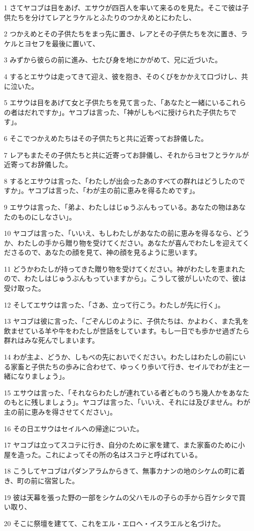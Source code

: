 \par 1 さてヤコブは目をあげ、エサウが四百人を率いて来るのを見た。そこで彼は子供たちを分けてレアとラケルとふたりのつかえめとにわたし、
\par 2 つかえめとその子供たちをまっ先に置き、レアとその子供たちを次に置き、ラケルとヨセフを最後に置いて、
\par 3 みずから彼らの前に進み、七たび身を地にかがめて、兄に近づいた。
\par 4 するとエサウは走ってきて迎え、彼を抱き、そのくびをかかえて口づけし、共に泣いた。
\par 5 エサウは目をあげて女と子供たちを見て言った、「あなたと一緒にいるこれらの者はだれですか」。ヤコブは言った、「神がしもべに授けられた子供たちです」。
\par 6 そこでつかえめたちはその子供たちと共に近寄ってお辞儀した。
\par 7 レアもまたその子供たちと共に近寄ってお辞儀し、それからヨセフとラケルが近寄ってお辞儀した。
\par 8 するとエサウは言った、「わたしが出会ったあのすべての群れはどうしたのですか」。ヤコブは言った、「わが主の前に恵みを得るためです」。
\par 9 エサウは言った、「弟よ、わたしはじゅうぶんもっている。あなたの物はあなたのものにしなさい」。
\par 10 ヤコブは言った、「いいえ、もしわたしがあなたの前に恵みを得るなら、どうか、わたしの手から贈り物を受けてください。あなたが喜んでわたしを迎えてくださるので、あなたの顔を見て、神の顔を見るように思います。
\par 11 どうかわたしが持ってきた贈り物を受けてください。神がわたしを恵まれたので、わたしはじゅうぶんもっていますから」。こうして彼がしいたので、彼は受け取った。
\par 12 そしてエサウは言った、「さあ、立って行こう。わたしが先に行く」。
\par 13 ヤコブは彼に言った、「ごぞんじのように、子供たちは、かよわく、また乳を飲ませている羊や牛をわたしが世話をしています。もし一日でも歩かせ過ぎたら群れはみな死んでしまいます。
\par 14 わが主よ、どうか、しもべの先においでください。わたしはわたしの前にいる家畜と子供たちの歩みに合わせて、ゆっくり歩いて行き、セイルでわが主と一緒になりましょう」。
\par 15 エサウは言った、「それならわたしが連れている者どものうち幾人かをあなたのもとに残しましょう」。ヤコブは言った、「いいえ、それには及びません。わが主の前に恵みを得させてください」。
\par 16 その日エサウはセイルへの帰途についた。
\par 17 ヤコブは立ってスコテに行き、自分のために家を建て、また家畜のために小屋を造った。これによってその所の名はスコテと呼ばれている。
\par 18 こうしてヤコブはパダンアラムからきて、無事カナンの地のシケムの町に着き、町の前に宿営した。
\par 19 彼は天幕を張った野の一部をシケムの父ハモルの子らの手から百ケシタで買い取り、
\par 20 そこに祭壇を建てて、これをエル・エロヘ・イスラエルと名づけた。

